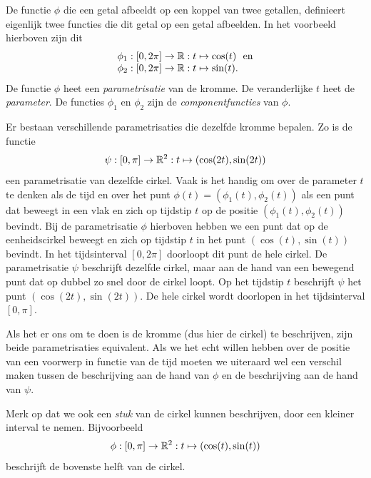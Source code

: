 \documentclass{ximera}
\begin{document}

De functie $\phi$ die een getal afbeeldt op een koppel van twee
getallen, definieert eigenlijk twee functies die dit getal op een
getal afbeelden. In het voorbeeld hierboven zijn dit
\[
\ba{l}
\phi_1: [0,2\pi] \rightarrow \R : t \mapsto \cos(t) ~\mbox{ en}\\
\phi_2: [0,2\pi] \rightarrow \R : t \mapsto \sin(t).
\ea
\]
De functie $\phi$ heet een {\em parametrisatie} van de kromme. De
veranderlijke $t$ heet de {\em parameter}. De functies $\phi_1$ en
$\phi_2$ zijn de {\em componentfuncties} van $\phi$.

Er bestaan verschillende parametrisaties die dezelfde kromme bepalen.
Zo is de functie
\[
\psi: [0,\pi] \rightarrow \R^2: t \mapsto (\cos(2t),\sin(2t))
\]
een parametrisatie van dezelfde cirkel.
Vaak is het handig om over de parameter $t$ te denken als de tijd en
over het punt $\phi(t)=(\phi_1(t),\phi_2(t))$ als een punt dat beweegt
in een vlak en zich op tijdstip $t$ op de positie
$(\phi_1(t),\phi_2(t))$ bevindt. Bij de parametrisatie $\phi$ hierboven
hebben we een punt dat op de eenheidscirkel beweegt en zich op
tijdstip $t$ in het punt $(\cos(t),\sin(t))$ bevindt. In het
tijdsinterval $[0,2\pi]$ doorloopt dit punt de hele cirkel. De
parametrisatie $\psi$ beschrijft dezelfde cirkel, maar aan de hand van
een bewegend punt dat op dubbel zo snel door de cirkel loopt. Op het
tijdstip $t$ beschrijft $\psi$ het punt $(\cos(2t),\sin(2t))$. De hele
cirkel wordt doorlopen in het tijdsinterval $[0,\pi]$.

Als het er ons om te doen is de kromme (dus hier de cirkel) te
beschrijven, zijn beide parametrisaties equivalent. Als we het echt
willen hebben over de positie van een voorwerp in functie van de tijd
moeten we uiteraard wel een verschil maken tussen de beschrijving aan
de hand van $\phi$ en de beschrijving aan de hand van $\psi$.


Merk op dat we ook een {\em stuk} van de cirkel kunnen beschrijven, door een
kleiner interval te nemen.
Bijvoorbeeld
\[
\phi:[0,\pi]\rightarrow \R^2: t \mapsto (\cos(t),\sin(t))
\]
beschrijft de bovenste helft van de cirkel.
\end{document}
